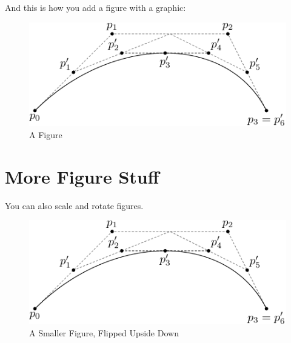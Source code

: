 \documentclass[12pt,twoside]{reedthesis}
\begin{document}
	And this is how you add a figure with a graphic:
	\begin{figure}[h]
	   
	       \centering
	    \includegraphics{subdivision}
	     \caption{A Figure}
	 \label{subd}
	\end{figure}

\clearpage %

\section{More Figure Stuff}
You can also scale and rotate figures.
 	\begin{figure}[h!]
	   
	       \centering
	    \includegraphics[scale=0.5,angle=180]{subdivision}
	     \caption{A Smaller Figure, Flipped Upside Down}
	 \label{subd2}
	\end{figure}
\end{document}
